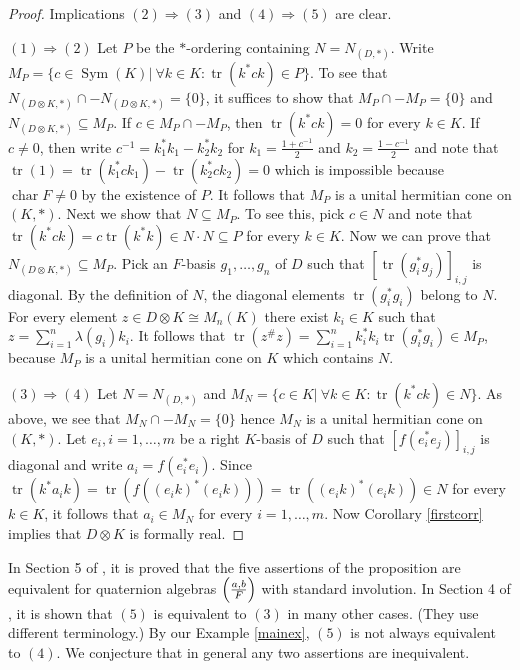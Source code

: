 \documentclass[12pt,reqno]{amsart}
\theoremstyle{definition}
\DeclareMathOperator{\sym}{Sym}
\DeclareMathOperator{\tr}{tr}
\DeclareMathOperator{\cha}{char}
\begin{document}
\begin{proof}
Implications $(2) \Rightarrow (3)$ and $(4) \Rightarrow (5)$ are clear.

$(1) \Rightarrow (2)$ Let $P$ be the $\ast$-ordering containing $N = N_{(D,\ast)}$.
Write $M_P = \{c \in \sym(K) \vert \ \forall k \in K \colon \tr(k^\ast c k) \in P\}$. 
To see that $N_{(D \otimes K,\ast)} \cap -N_{(D \otimes K,\ast)}=\{0\}$, it suffices 
to show that $M_P \cap -M_P =\{0\}$ and $N_{(D \otimes K,\ast)} \subseteq M_P$.
If $c \in M_P \cap -M_P$, then $\tr(k^\ast c k)=0$ for every $k \in K$.
If $c \ne 0$, then write $c^{-1}=k_1^\ast k_1-k_2^\ast k_2$ for $k_1=\frac{1 + c^{-1}}{2}$ and 
$k_2=\frac{1 - c^{-1}}{2}$ and note that $\tr(1) = \tr(k_1^\ast c k_1)-\tr(k_2^\ast c k_2)=0$
which is impossible because $\cha F \ne 0$ by the existence of $P$. 
It follows that $M_P$ is a unital hermitian cone on $(K,\ast)$.
Next we show that $N \subseteq M_P$. To see this, pick  $c \in N$ and note that 
$\tr(k^\ast c k) = c \tr(k^\ast k) \in N \cdot N \subseteq P$ for every $k \in K$.
Now we can prove that $N_{(D \otimes K,\ast)} \subseteq M_P$. Pick an $F$-basis
$g_1,\ldots,g_n$ of $D$ such that $\left[ \tr(g_i^\ast g_j) \right]_{i,j}$ is diagonal.
By the definition of $N$, the diagonal elements $\tr(g_i^\ast g_i)$ belong to $N$.
For every element $z \in D \otimes K \cong M_n(K)$ there exist $k_i \in K$
such that $z = \sum_{i=1}^n \lambda(g_i) k_i $. It follows that
$\tr(z^\# z) = \sum_{i=1}^n k_i^\ast k_i \tr(g_i^\ast g_i) \in M_P$,
because $M_P$ is a unital hermitian cone on $K$ which contains $N$.

$(3) \Rightarrow (4)$ Let $N = N_{(D,\ast)}$ and $M_N = 
\{c \in K \vert \ \forall k \in K \colon \tr(k^\ast c k) \in N\}$. 
As above, we see that $M_N \cap -M_N=\{0\}$ hence $M_N$
is a unital hermitian cone on $(K,\ast)$. 
Let $e_i, i=1,\ldots,m$ be a right $K$-basis of $D$ such that 
$\left[ f(e_i^\ast e_j) \right]_{i,j}$ is diagonal and write 
$a_i = f(e_i^\ast e_i)$. Since $\tr(k^\ast a_i k)=
\tr(f((e_i k)^\ast (e_i k)))=\tr((e_i k)^\ast (e_i k)) \in N$
for every $k \in K$, it follows that $a_i \in M_N$ for every $i=1,\ldots,m$.
Now Corollary \ref{firstcorr} implies that $D \otimes K$ is formally real.
\end{proof}

In Section 5 of \cite{ps}, it is proved that the five assertions of
the proposition are equivalent for quaternion algebras $\left( {a,b \over F} \right)$
with standard involution. In Section 4 of \cite{lsu}, it is shown that $(5)$ is equivalent to $(3)$ 
in many other cases. (They use different terminology.) By our Example \ref{mainex},
$(5)$ is not always equivalent to $(4)$. We conjecture that in general any two assertions are inequivalent.
\end{document}
